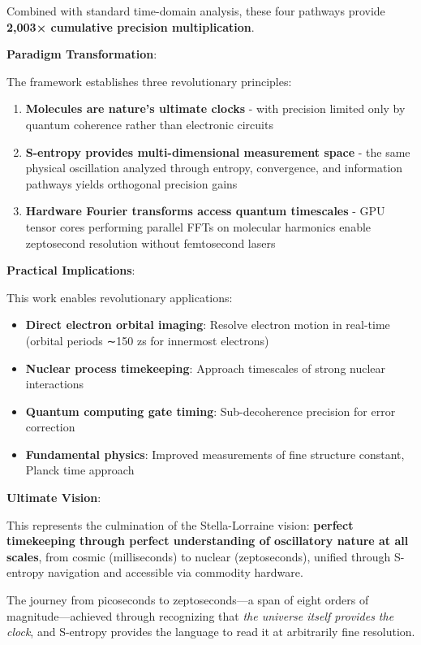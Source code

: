 \documentclass[12pt,a4paper]{article}
\begin{document}
Combined with standard time-domain analysis, these four pathways provide \textbf{2,003× cumulative precision multiplication}.

\textbf{Paradigm Transformation}:

The framework establishes three revolutionary principles:

\begin{enumerate}
\item \textbf{Molecules are nature's ultimate clocks} - with precision limited only by quantum coherence rather than electronic circuits

\item \textbf{S-entropy provides multi-dimensional measurement space} - the same physical oscillation analyzed through entropy, convergence, and information pathways yields orthogonal precision gains

\item \textbf{Hardware Fourier transforms access quantum timescales} - GPU tensor cores performing parallel FFTs on molecular harmonics enable zeptosecond resolution without femtosecond lasers
\end{enumerate}

\textbf{Practical Implications}:

This work enables revolutionary applications:
\begin{itemize}
\item \textbf{Direct electron orbital imaging}: Resolve electron motion in real-time (orbital periods ∼150 zs for innermost electrons)
\item \textbf{Nuclear process timekeeping}: Approach timescales of strong nuclear interactions
\item \textbf{Quantum computing gate timing}: Sub-decoherence precision for error correction
\item \textbf{Fundamental physics}: Improved measurements of fine structure constant, Planck time approach
\end{itemize}

\textbf{Ultimate Vision}:

This represents the culmination of the Stella-Lorraine vision: \textbf{perfect timekeeping through perfect understanding of oscillatory nature at all scales}, from cosmic (milliseconds) to nuclear (zeptoseconds), unified through S-entropy navigation and accessible via commodity hardware.

The journey from picoseconds to zeptoseconds—a span of eight orders of magnitude—achieved through recognizing that \textit{the universe itself provides the clock}, and S-entropy provides the language to read it at arbitrarily fine resolution.
\end{document}
